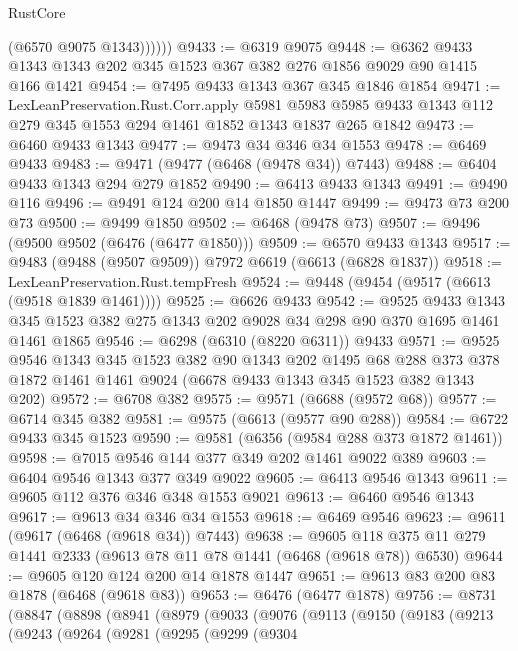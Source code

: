 \begin{lexlean}{RustCore}
\begin{coremodule}
{\begin{coremodule}
{{{{{{{{{{{{{{{{{{{{{{{{{{{{{{{{{{{{{{{{{{{{{{{              (@6570 @9075 @1343))))))
@9433 := @6319 @9075
@9448 := @6362 @9433 @1343 @1343 @202 @345 @1523 @367 @382 @276 @1856 @9029 @90 @1415 @166 @1421
@9454 := @7495 @9433 @1343 @367 @345 @1846 @1854
@9471 := LexLeanPreservation.Rust.Corr.apply
    @5981
    @5983
    @5985
    @9433
    @1343
    @112
    @279
    @345
    @1553
    @294
    @1461
    @1852
    @1343
    @1837
    @265
    @1842
@9473 := @6460 @9433 @1343
@9477 := @9473 @34 @346 @34 @1553
@9478 := @6469 @9433
@9483 := @9471 (@9477 (@6468 (@9478 @34)) @7443)
@9488 := @6404 @9433 @1343 @294 @279 @1852
@9490 := @6413 @9433 @1343
@9491 := @9490 @116
@9496 := @9491 @124 @200 @14 @1850 @1447
@9499 := @9473 @73 @200 @73
@9500 := @9499 @1850
@9502 := @6468 (@9478 @73)
@9507 := @9496 (@9500 @9502 (@6476 (@6477 @1850)))
@9509 := @6570 @9433 @1343
@9517 := @9483 (@9488 (@9507 @9509)) @7972 @6619 (@6613 (@6828 @1837))
@9518 := LexLeanPreservation.Rust.tempFresh
@9524 := @9448 (@9454 (@9517 (@6613 (@9518 @1839 @1461))))
@9525 := @6626 @9433
@9542 := @9525
    @9433
    @1343
    @345
    @1523
    @382
    @275
    @1343
    @202
    @9028
    @34
    @298
    @90
    @370
    @1695
    @1461
    @1461
    @1865
@9546 := @6298 (@6310 (@8220 @6311)) @9433
@9571 := @9525
    @9546
    @1343
    @345
    @1523
    @382
    @90
    @1343
    @202
    @1495
    @68
    @288
    @373
    @378
    @1872
    @1461
    @1461
    @9024
    (@6678 @9433 @1343 @345 @1523 @382 @1343 @202)
@9572 := @6708 @382
@9575 := @9571 (@6688 (@9572 @68))
@9577 := @6714 @345 @382
@9581 := @9575 (@6613 (@9577 @90 @288))
@9584 := @6722 @9433 @345 @1523
@9590 := @9581 (@6356 (@9584 @288 @373 @1872 @1461))
@9598 := @7015 @9546 @144 @377 @349 @202 @1461 @9022 @389
@9603 := @6404 @9546 @1343 @377 @349 @9022
@9605 := @6413 @9546 @1343
@9611 := @9605 @112 @376 @346 @348 @1553 @9021
@9613 := @6460 @9546 @1343
@9617 := @9613 @34 @346 @34 @1553
@9618 := @6469 @9546
@9623 := @9611 (@9617 (@6468 (@9618 @34)) @7443)
@9638 := @9605 @118 @375 @11 @279 @1441 @2333 (@9613 @78 @11 @78 @1441 (@6468 (@9618 @78)) @6530)
@9644 := @9605 @120 @124 @200 @14 @1878 @1447
@9651 := @9613 @83 @200 @83 @1878 (@6468 (@9618 @83))
@9653 := @6476 (@6477 @1878)
@9756 := @8731
    (@8847
      (@8898
        (@8941
          (@8979
            (@9033
              (@9076
                (@9113
                  (@9150
                    (@9183
                      (@9213
                        (@9243
                          (@9264
                            (@9281
                              (@9295
                                (@9299
                                  (@9304
}}}}}}}}}}}}}}}}}}}}}}}}}}}}}}}}}}}}}}}}}}}}}}}
\end{coremodule}}
\end{coremodule}
\end{lexlean}
